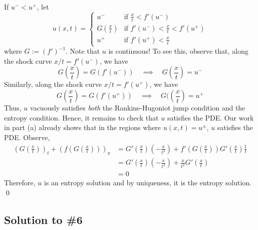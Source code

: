 If $u^- < u^+$, let
$$ u(x,t) = \left\{
\begin{array}{cc}
u^- & \text{if} \,\, \frac{x}{t} < f'(u^-) \\
G\left( \frac{x}{t} \right) & \text{if} \,\, f'(u^-) < \frac{x}{t} < f'(u^+) \\
u^+ & \text{if} \,\, f'(u^+) < \frac{x}{t}
\end{array} \right. $$
where $G := (f')^{-1}$.
Note that $u$ is continuous! To see this, observe that, along the shock curve $x/t = f'(u^-)$, we have
$$ G\left( \frac{x}{t} \right) = G(f'(u^-)) \quad \implies \quad G\left( \frac{x}{t} \right) = u^- $$
Similarly, along the shock curve $x/t = f'(u^+)$, we have
$$ G\left( \frac{x}{t} \right) = G(f'(u^+)) \quad \implies \quad G(\left( \frac{x}{t} \right) = u^+ $$
Thus, $u$ vacuously satisfies \emph{both} the Rankine-Hugoniot jump condition and the entropy condition. Hence, it remains to check that $u$ satisfies the PDE. Our work in part (a) already shows that in the regions where $u(x,t) = u^{\pm}$, $u$ satisfies the PDE. Observe,
\begin{align*}
\left( G\left( \frac{x}{t} \right) \right)_t + \left( f \left( G \left( \frac{x}{t} \right) \right) \right)_x &= G'\left( \frac{x}{t} \right) \left( -\frac{x}{t^2} \right) + f'\left( G\left( \frac{x}{t} \right) \right) G'\left( \frac{x}{t} \right) \frac{1}{t} \\
&= G'\left( \frac{x}{t} \right) \left( -\frac{x}{t^2} \right) + \frac{x}{t^2} G'\left( \frac{x}{t} \right) \\
&= 0
\end{align*}
Therefore, $u$ is an entropy solution and by uniqueness, it is the entropy solution. \hfill \qed

\subsection*{Solution to \#6}
\label{F11Q6}

